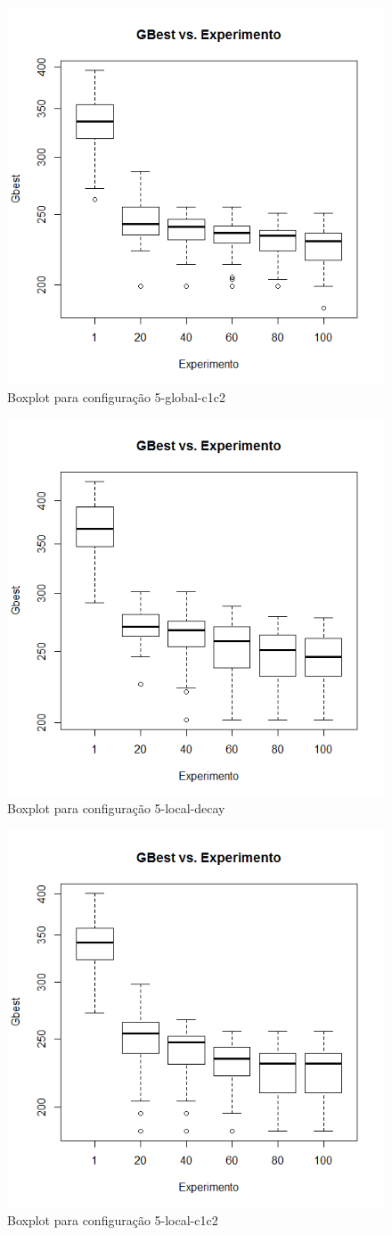 \begin{figure}[H]
	\centering
	\includegraphics[width=.6\textwidth]{img/result_5_global_c1c2.png}
	\caption{Boxplot para configura\c{c}\~ao 5-global-c1c2}
	\label{fig:result_5_global_c1c2}
\end{figure}

\begin{figure}[H]
	\centering
	\includegraphics[width=.6\textwidth]{img/result_5_local_decay.png}
	\caption{Boxplot para configura\c{c}\~ao 5-local-decay}
	\label{fig:result_5_local_decay}
\end{figure}

\begin{figure}[H]
	\centering
	\includegraphics[width=.6\textwidth]{img/result_5_local_c1c2.png}
	\caption{Boxplot para configura\c{c}\~ao 5-local-c1c2}
	\label{fig:result_5_local_c1c2}
\end{figure}

